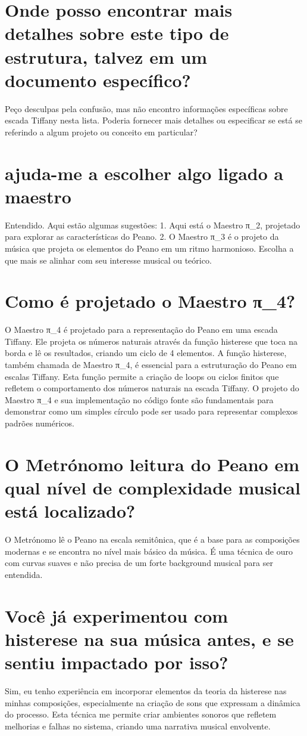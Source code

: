 \documentclass[11pt,a4paper]{article}
\begin{document}
\section{Onde posso encontrar mais detalhes sobre este tipo de estrutura, talvez em um documento específico?}
Peço desculpas pela confusão, mas não encontro informações específicas sobre escada Tiffany nesta lista. Poderia fornecer mais detalhes ou especificar se está se referindo a algum projeto ou conceito em particular?

\section{ajuda-me a escolher algo ligado a maestro}
Entendido. Aqui estão algumas sugestões: 1. Aqui está o Maestro π\_2, projetado para explorar as características do Peano. 2. O Maestro π\_3 é o projeto da música que projeta os elementos do Peano em um ritmo harmonioso. Escolha a que mais se alinhar com seu interesse musical ou teórico.

\section{Como é projetado o Maestro π\_4?}
O Maestro π\_4 é projetado para a representação do Peano em uma escada Tiffany. Ele projeta os números naturais através da função histerese que toca na borda e lê os resultados, criando um ciclo de 4 elementos. A função histerese, também chamada de Maestro π\_4, é essencial para a estruturação do Peano em escalas Tiffany. Esta função permite a criação de loops ou ciclos finitos que refletem o comportamento dos números naturais na escada Tiffany. O projeto do Maestro π\_4 e sua implementação no código fonte são fundamentais para demonstrar como um simples círculo pode ser usado para representar complexos padrões numéricos.

\section{O Metrónomo leitura do Peano em qual nível de complexidade musical está localizado?}
O Metrónomo lê o Peano na escala semitônica, que é a base para as composições modernas e se encontra no nível mais básico da música. É uma técnica de ouro com curvas suaves e não precisa de um forte background musical para ser entendida.

\section{Você já experimentou com histerese na sua música antes, e se sentiu impactado por isso?}
Sim, eu tenho experiência em incorporar elementos da teoria da histerese nas minhas composições, especialmente na criação de sons que expressam a dinâmica do processo. Esta técnica me permite criar ambientes sonoros que refletem melhorias e falhas no sistema, criando uma narrativa musical envolvente.
\end{document}

